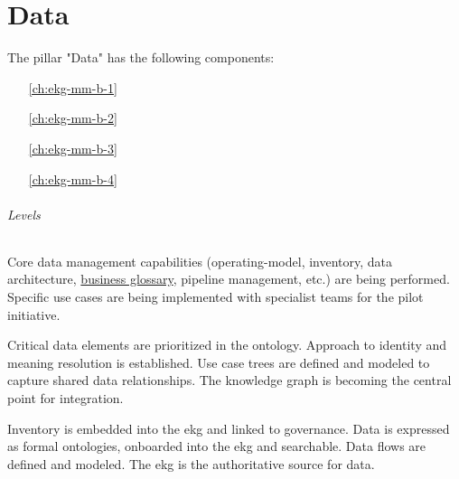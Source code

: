 \part{Data}\label{pt:ekgmm-b} %

The pillar "Data" has the following components:

\begin{itemize}[leftmargin=.5in]
  \item [\ref{ch:ekg-mm-b-1}] 
  \item [\ref{ch:ekg-mm-b-2}] 
  \item [\ref{ch:ekg-mm-b-3}] 
  \item [\ref{ch:ekg-mm-b-4}] 
\end{itemize}

\paragraph{Levels}

\begin{description}[nosep,font=\bfseries]

    \item [1. \ekgmmLevelOneLabel]
    Core data management capabilities (\gls{operating-model}, inventory, data architecture,
    \hyperref[sec:ekg-mm-business-glossary]{business glossary}, pipeline management, etc.) are being performed.
    Specific use cases are being implemented with specialist teams for the pilot initiative.
    
    \item [2. \ekgmmLevelTwoLabel]
    Critical data elements are prioritized in the ontology.
    Approach to identity and meaning resolution is established.
    Use case trees are defined and modeled to capture shared data relationships.
    The knowledge graph is becoming the central point for integration.

    \item [3. \ekgmmLevelThreeLabel]
    Inventory is embedded into the \gls{ekg} and linked to governance.
    Data is expressed as formal ontologies, onboarded into the \gls{ekg} and searchable.
    Data flows are defined and modeled.
    The \gls{ekg} is the authoritative source for data.

\end{description}





